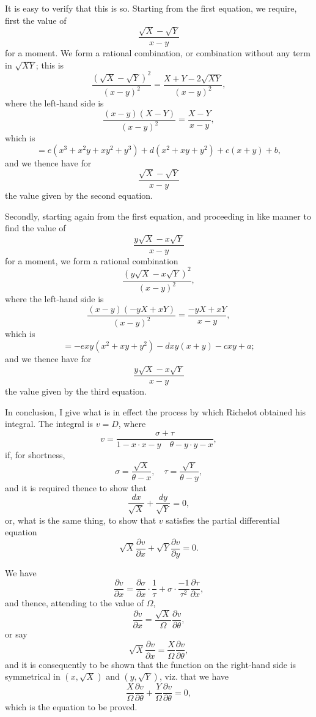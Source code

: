 \documentclass[11pt,a4paper]{book}
\begin{document}
It is easy to verify that this is so. Starting from the first equation, we require, first the value of
\[
\frac{\sqrt{X}-\sqrt{Y}}{x-y}
\]
for a moment. We form a rational combination, or combination without any term in $\sqrt{XY}$; this is
\[
\frac{(\sqrt{X}-\sqrt{Y})^2}{(x-y)^2} = \frac{X+Y-2\sqrt{XY}}{(x-y)^2},
\]
where the left-hand side is
\[
\frac{(x-y)(X-Y)}{(x-y)^2} = \frac{X-Y}{x-y},
\]
which is
\[
= e(x^3+x^2y+xy^2+y^3) + d(x^2+xy+y^2) + c(x+y) + b,
\]
and we thence have for
\[
\frac{\sqrt{X}-\sqrt{Y}}{x-y}
\]
the value given by the second equation.

Secondly, starting again from the first equation, and proceeding in like manner to find the value of
\[
\frac{y\sqrt{X}-x\sqrt{Y}}{x-y}
\]
for a moment, we form a rational combination
\[
\frac{(y\sqrt{X}-x\sqrt{Y})^2}{(x-y)^2},
\]
where the left-hand side is
\[
\frac{(x-y)(-yX+xY)}{(x-y)^2} = \frac{-yX+xY}{x-y},
\]
which is
\[
= -exy(x^2+xy+y^2) - dxy(x+y) - cxy + a;
\]
and we thence have for
\[
\frac{y\sqrt{X}-x\sqrt{Y}}{x-y}
\]
the value given by the third equation.

In conclusion, I give what is in effect the process by which Richelot obtained his integral. The integral is $v=D$, where
\[
v = \frac{\sigma + \tau}{1-x\cdot x-y\quad \theta-y\cdot y-x},
\]
if, for shortness,
\[
\sigma = \frac{\sqrt{X}}{\theta-x}, \quad \tau = \frac{\sqrt{Y}}{\theta-y},
\]
and it is required thence to show that
\[
\frac{dx}{\sqrt{X}} + \frac{dy}{\sqrt{Y}} = 0,
\]
or, what is the same thing, to show that $v$ satisfies the partial differential equation
\[
\sqrt{X}\frac{\partial v}{\partial x} + \sqrt{Y}\frac{\partial v}{\partial y} = 0.
\]

We have
\[
\frac{\partial v}{\partial x} = \frac{\partial\sigma}{\partial x}\cdot\frac{1}{\tau} + \sigma\cdot\frac{-1}{\tau^2}\frac{\partial\tau}{\partial x},
\]
and thence, attending to the value of $\Omega$,
\[
\frac{\partial v}{\partial x} = \frac{\sqrt{X}}{\Omega}\frac{\partial v}{\partial\theta},
\]
or say
\[
\sqrt{X}\frac{\partial v}{\partial x} = \frac{X}{\Omega}\frac{\partial v}{\partial\theta},
\]
and it is consequently to be shown that the function on the right-hand side is symmetrical in $(x,\sqrt{X})$ and $(y,\sqrt{Y})$, viz. that we have
\[
\frac{X}{\Omega}\frac{\partial v}{\partial\theta} + \frac{Y}{\Omega}\frac{\partial v}{\partial\theta} = 0,
\]
which is the equation to be proved.

\newpage
\end{document}
